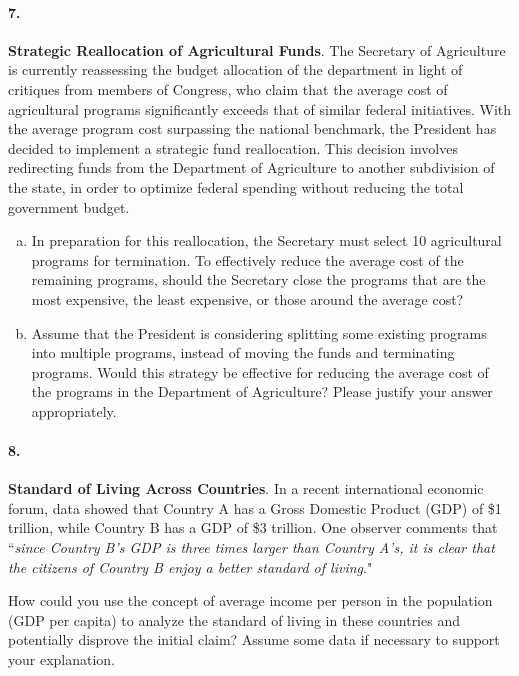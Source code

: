 \documentclass{article}
\begin{document}
\paragraph{7.} \textbf{Strategic Reallocation of Agricultural Funds}. The Secretary of Agriculture is currently reassessing the budget allocation of the department in light of critiques from members of Congress, who claim that the average cost of agricultural programs significantly exceeds that of similar federal initiatives. With the average program cost surpassing the national benchmark, the President has decided to implement a strategic fund reallocation. This decision involves redirecting funds from the Department of Agriculture to another subdivision of the state, in order to optimize federal spending without reducing the total government budget. 

\begin{enumerate}[a)]
    \item In preparation for this reallocation, the Secretary must select 10 agricultural programs for termination. To effectively reduce the average cost of the remaining programs, should the Secretary close the programs that are the most expensive, the least expensive, or those around the average cost?
    \item Assume that the President is considering splitting some existing programs into multiple programs, instead of moving the funds and terminating programs. Would this strategy be effective for reducing the average cost of the programs in the Department of Agriculture? Please justify your answer appropriately.
\end{enumerate}

\paragraph{8.} \textbf{Standard of Living Across Countries}. In a recent international economic forum, data showed that Country A has a Gross Domestic Product (GDP) of \$1 trillion, while Country B has a GDP of \$3 trillion. One observer comments that ``\emph{since Country B's GDP is three times larger than Country A's, it is clear that the citizens of Country B enjoy a better standard of living}."
\par How could you use the concept of average income per person in the population (GDP per capita) to analyze the standard of living in these countries and potentially disprove the initial claim? Assume some data if necessary to support your explanation.
\end{document}
